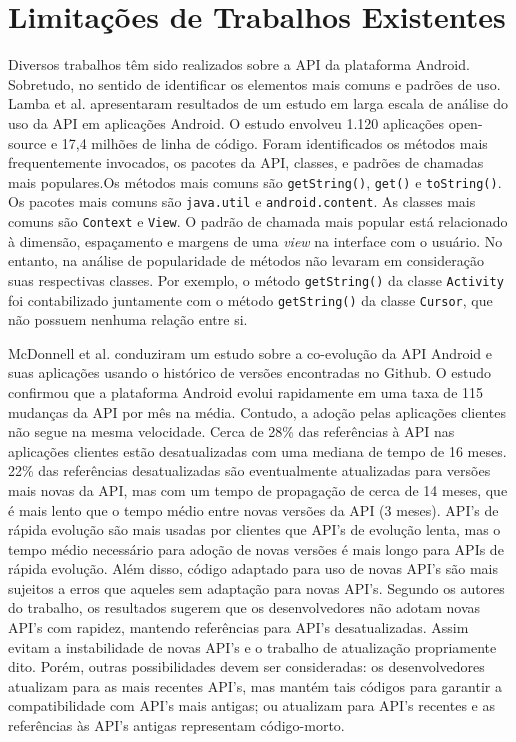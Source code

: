 \section{Limitações de Trabalhos Existentes} \label{sec:limitacao-abordagens-atuais}
Diversos trabalhos têm sido realizados sobre a API da plataforma Android. Sobretudo,
no sentido
de identificar os elementos mais comuns e padrões de uso. Lamba et al.\cite{Lamba2015} apresentaram
resultados de um estudo em larga escala de análise do uso da API em aplicações Android.
O estudo envolveu 1.120 aplicações open-source e 17,4 milhões de linha de código.
Foram identificados os métodos mais frequentemente invocados, os pacotes da API,
classes, e padrões de chamadas mais populares.Os métodos mais comuns são \texttt{getString()},
\texttt{get()} e \texttt{toString()}. Os pacotes mais comuns são \texttt{java.util} e
\texttt{android.content}. As classes mais comuns são \texttt{Context} e \texttt{View}.
O padrão de chamada mais popular está relacionado à dimensão, espaçamento e margens
de uma \textit{view} na interface com o usuário. No entanto, na análise de popularidade
de métodos não levaram em consideração suas respectivas classes. Por exemplo, o método
\texttt{getString()} da classe \texttt{Activity} foi contabilizado juntamente com
o método \texttt{getString()} da classe \texttt{Cursor}, que não possuem nenhuma
relação entre si.

McDonnell et al. \cite{McDonnell2013} conduziram um estudo sobre a co-evolução
da API Android e suas aplicações usando o histórico de versões encontradas no
Github. O estudo confirmou que a plataforma Android evolui rapidamente em uma
taxa de 115 mudanças da API por mês na média. Contudo, a adoção pelas aplicações
clientes não segue na mesma velocidade. Cerca de 28\% das referências à API nas
aplicações clientes estão desatualizadas com uma mediana de tempo de 16 meses.
22\% das referências desatualizadas são eventualmente atualizadas para versões
mais novas da API, mas com um tempo de propagação de cerca de 14 meses, que é mais
lento que o tempo médio entre novas versões da API (3 meses). API's de rápida
evolução são mais usadas por clientes que API's de evolução lenta, mas o tempo
médio necessário para adoção de novas versões é mais longo para APIs de rápida
evolução. Além disso, código adaptado para uso de novas API's são mais sujeitos a
erros que aqueles sem adaptação para novas API's. Segundo os autores do trabalho,
os resultados sugerem que os desenvolvedores não adotam novas API's com rapidez,
mantendo referências para API's desatualizadas. Assim evitam a instabilidade de
novas API's e o trabalho de atualização propriamente dito. Porém, outras possibilidades
devem ser consideradas: os desenvolvedores atualizam para as mais recentes API's,
mas mantém tais códigos para garantir a compatibilidade com API's mais antigas;
ou atualizam para API's recentes e as referências às API's antigas representam
código-morto.

